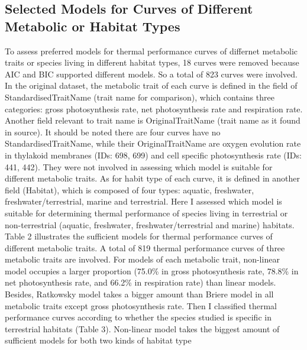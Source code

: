 \documentclass[11pt]{article}
\begin{document}
        \subsection{Selected Models for Curves of Different Metabolic or Habitat Types}
        To assess preferred models for thermal performance curves of differnet metabolic traits or species living in different 
        habitat types, 18 curves were removed because AIC and BIC supported different models. So a total of 823 
        curves were involved.
        \newline  
        In the original dataset, the metabolic trait of each curve is defined in the field of StandardisedTraitName 
        (trait name for comparison), 
        which contains three categories: gross photosynthesis rate, net photosynthesis rate and respiration rate. Another field 
        relevant to 
        trait name is OriginalTraitName (trait name as it found in source). It should be noted there are four curves 
        have no StandardisedTraitName, while their OriginalTraitName are oxygen evolution 
        rate in thylakoid membranes (IDs: 698, 699) and cell specific photosynthesis rate (IDs: 441, 442). They were not 
        involved in assessing which model is suitable for different metabolic traits.
        As for habit type of each curve, it is defined in another field (Habitat), which is composed of four types: aquatic, 
        freshwater, freshwater/terrestrial, marine and terrestrial. Here I assessed which model is suitable for determining 
        thermal performance of species living in terrestrial or non-terrestrial (aquatic, 
        freshwater, freshwater/terrestrial and marine) habitats.
        \newline  
        Table 2 illustrates the sufficient models for thermal performance curves of different metabolic traits. 
        A total of 819 thermal performance curves of three metabolic traits are involved. 
        For models of each metabolic trait, non-linear  
        model occupies a larger proportion 
        (75.0\% in gross photosynthesis rate, 78.8\% in net photosynthesis rate, and 66.2\% in respiration rate) than linear 
        models. Besides, Ratkowsky model takes a bigger amount than Briere model in all metabolic traits except gross 
        photosynthesis rate.
        \newline
        Then I classified thermal performance curves according to whether the species studied is specific in terrestrial 
        habitats (Table 3). Non-linear model 
        takes the biggest amount of sufficient models for both two kinds of habitat type 
\end{document}
